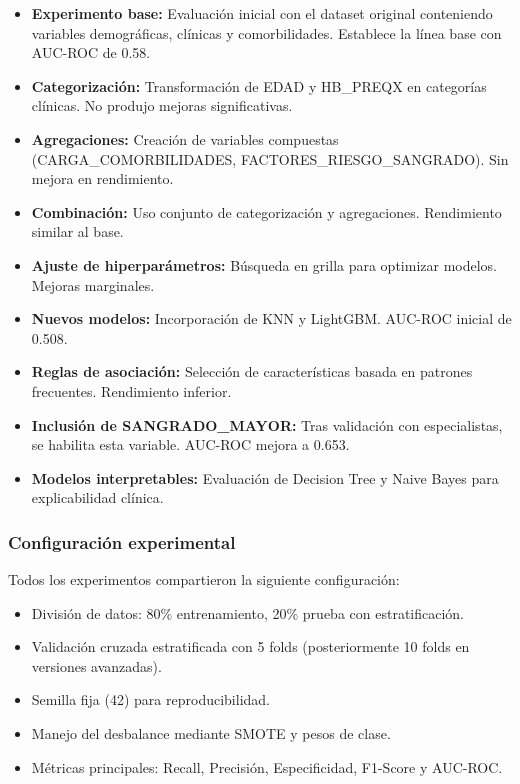 \documentclass[12pt, letterpaper]{article}
\begin{document}
\begin{itemize}
    \item \textbf{Experimento base:} Evaluación inicial con el dataset original conteniendo variables demográficas, clínicas y comorbilidades. Establece la línea base con AUC-ROC de 0.58.
    \item \textbf{Categorización:} Transformación de EDAD y HB\_PREQX en categorías clínicas. No produjo mejoras significativas.
    \item \textbf{Agregaciones:} Creación de variables compuestas (CARGA\_COMORBILIDADES, FACTORES\_RIESGO\_SANGRADO). Sin mejora en rendimiento.
    \item \textbf{Combinación:} Uso conjunto de categorización y agregaciones. Rendimiento similar al base.
    \item \textbf{Ajuste de hiperparámetros:} Búsqueda en grilla para optimizar modelos. Mejoras marginales.
    \item \textbf{Nuevos modelos:} Incorporación de KNN y LightGBM. AUC-ROC inicial de 0.508.
    \item \textbf{Reglas de asociación:} Selección de características basada en patrones frecuentes. Rendimiento inferior.
    \item \textbf{Inclusión de SANGRADO\_MAYOR:} Tras validación con especialistas, se habilita esta variable. AUC-ROC mejora a 0.653.
    \item \textbf{Modelos interpretables:} Evaluación de Decision Tree y Naive Bayes para explicabilidad clínica.
\end{itemize}

\subsubsection{Configuración experimental}

Todos los experimentos compartieron la siguiente configuración:

\begin{itemize}
    \item División de datos: 80\% entrenamiento, 20\% prueba con estratificación.
    \item Validación cruzada estratificada con 5 folds (posteriormente 10 folds en versiones avanzadas).
    \item Semilla fija (42) para reproducibilidad.
    \item Manejo del desbalance mediante SMOTE y pesos de clase.
    \item Métricas principales: Recall, Precisión, Especificidad, F1-Score y AUC-ROC.
\end{itemize}
\end{document}
